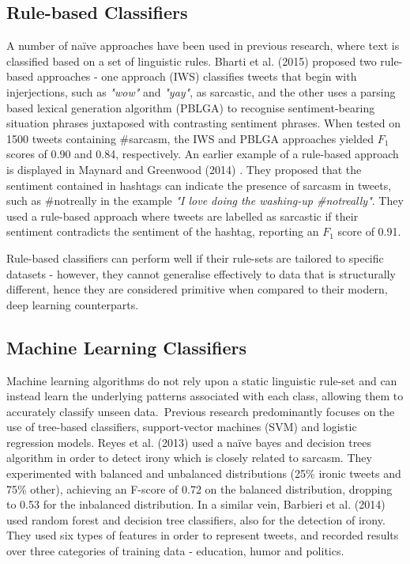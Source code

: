 \documentclass[12pt,a4paper]{article}
\begin{document}
\subsection{Rule-based Classifiers}\vspace{-10pt}
\noindent A number of na\"{i}ve approaches have been used in previous research, where text is classified based on a set of linguistic rules. Bharti et al. (2015) \cite{bharti2015parsing} proposed two rule-based approaches - one approach (IWS) classifies tweets that begin with injerjections, such as \textit{"wow"} and \textit{"yay"}, as sarcastic, and the other uses a parsing based lexical generation algorithm (PBLGA) to recognise sentiment-bearing situation phrases juxtaposed with contrasting sentiment phrases. When tested on 1500 tweets containing \#sarcasm, the IWS and PBLGA approaches yielded $F_1$ scores of 0.90 and 0.84, respectively. An earlier example of a rule-based approach is displayed in Maynard and Greenwood (2014) \cite{maynard2014cares}. They proposed that the sentiment contained in hashtags can indicate the presence of sarcasm in tweets, such as \#notreally in the example \textit{"I love doing the washing-up \#notreally"}. They used a rule-based approach where tweets are labelled as sarcastic if their sentiment contradicts the sentiment of the hashtag, reporting an $F_{1}$ score of 0.91. 

Rule-based classifiers can perform well if their rule-sets are tailored to specific datasets - however, they cannot generalise effectively to data that is structurally different, hence they are considered  primitive when compared to their modern, deep learning counterparts.

\subsection{Machine Learning Classifiers}\vspace{-10pt}
\noindent Machine learning algorithms do not rely upon a static linguistic rule-set and can instead learn the underlying patterns associated with each class, allowing them to accurately classify unseen data.\ Previous research predominantly focuses on the use of tree-based classifiers, support-vector machines (SVM) and logistic regression models. Reyes et al. (2013) \cite{reyes2013multidimensional} used a na\"{i}ve bayes and decision trees algorithm in order to detect irony which is closely related to sarcasm. They experimented with balanced and unbalanced distributions (25\% ironic tweets and 75\% other), achieving an F-score of 0.72 on the balanced distribution, dropping to 0.53 for the inbalanced distribution. In a similar vein, Barbieri et al. (2014) \cite{barbieri2014modelling} used random forest and decision tree classifiers, also for the detection of irony. They used six types of features in order to represent tweets, and recorded results over three categories of training data - education, humor and politics.
\end{document}
